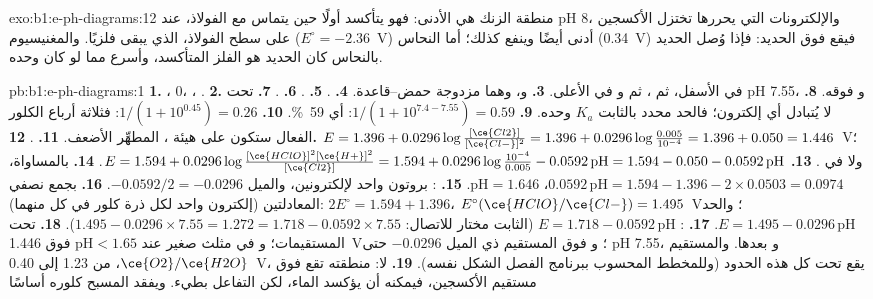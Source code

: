 \begin{solution}{exo:b1:e-ph-diagrams:12}
منطقة الزنك هي الأدنى: فهو يتأكسد أولًا حين يتماس مع الفولاذ،
 عند pH 8، والإلكترونات التي
يحررها تختزل الأكسجين على سطح الفولاذ، الذي يبقى فلزيًا.
والمغنيسيوم ($E^\circ = -2.36$~V) أدنى أيضًا وينفع كذلك؛ أما النحاس
(0.34~V) فيقع فوق الحديد: فإذا وُصل الحديد بالنحاس كان الحديد هو الفلز
المتأكسد، وأسرع مما لو كان وحده.
\end{solution}

\begin{solution}{pb:b1:e-ph-diagrams:1}
\textbf{1.} ، 0، ، .
\textbf{2.}  في الأسفل، ثم ، ثم  و
في الأعلى.
\textbf{3.}  و، وهما مزدوجة حمض--قاعدة.
\textbf{4.} .
\textbf{5.} .
\textbf{6.} .
\textbf{7.}  تحت pH 7.55، و فوقه.
\textbf{8.} لا يُتبادل أي إلكترون؛ فالحد محدد بالثابت $K_a$ وحده.
\textbf{9.} $1/(1 + 10^{7.4 - 7.55}) = 0.59$: أي \qty{59}{\percent}.
\textbf{10.} $1/(1 + 10^{0.45}) = 0.26$: فثلاثة أرباع الكلور الفعال
ستكون على هيئة ، المطهِّر الأضعف.
\textbf{11.} .
\textbf{12.} $E = 1.396 + 0.0296\log\frac{[\ce{Cl2}]}{[\ce{Cl-}]^2} = 1.396
+ 0.0296\log\frac{0.005}{10^{-4}} = 1.396 + 0.050 = 1.446$~V؛ ولا 
في .
\textbf{13.} $E = 1.594 + 0.0296\log\frac{[\ce{HClO}]^2[\ce{H+}]^2}{[\ce{Cl2}]}
= 1.594 + 0.0296\log\frac{10^{-4}}{0.005} - 0.0592\,\mathrm{pH} = 1.594 -
0.050 - 0.0592\,\mathrm{pH}$.
\textbf{14.} بالمساواة، $0.0592\,\mathrm{pH} = 1.594 - 1.396 - 2 \times 0.0503
= 0.0974$، $\mathrm{pH} = 1.646$.
\textbf{15.} : بروتون واحد لإلكترونين،
والميل $-0.0592/2 = -0.0296$.
\textbf{16.} بجمع نصفي المعادلتين (إلكترون واحد لكل ذرة كلور
في كل منهما): $2E^\circ = 1.594 + 1.396$، $E^\circ(\ce{HClO}/\ce{Cl-}) =
1.495$~V؛ والحد $E = 1.495 - 0.0296\,\mathrm{pH}$.
\textbf{17.} : $E = 1.718 - 0.0592\,\mathrm{pH}$
(الثابت مختار للاتصال: $1.495 - 0.0296 \times 7.55 = 1.272 = 1.718
- 0.0592 \times 7.55$).
\textbf{18.}  تحت المستقيمات؛ و في مثلث صغير عند
$\mathrm{pH} < 1.65$ فوق 1.446~V؛ و فوق المستقيم ذي الميل
$-0.0296$ حتى pH 7.55، و بعدها. والمستقيم $\ce{O2}/\ce{H2O}$،
من 1.23 إلى 0.40~V، يقع تحت كل هذه الحدود (وللمخطط
المحسوب ببرنامج الفصل الشكل نفسه).
\textbf{19.} لا: منطقته تقع فوق مستقيم الأكسجين، فيمكنه أن
يؤكسد الماء، لكن التفاعل بطيء. ويفقد المسبح كلوره أساسًا

\end{solution}
